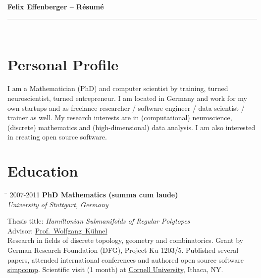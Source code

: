 \documentclass[10pt]{article} %
\newlength{\marginwidth}
\newlength{\smallertextwidth}
\renewcommand{\title}[1]{
{\huge{\color{headercolor}\textbf{#1}}}\\
\rule{\textwidth}{0.5mm}\\
}
\newcommand{\education}[4]{
\begin{tabbing}%
\hspace{\marginwidth}\=\kill%
{#1} \> \textbf{#2}\\
\>\+ \textit{#3}\\[5pt]
\begin{minipage}{\smallertextwidth}
\vspace{5pt}
#4
\end{minipage}
\end{tabbing}
}
\begin{document}

\title{Felix Effenberger -- Résumé}




\section{Personal Profile}
%
I am a Mathematician (PhD) and computer scientist by training, turned neuroscientist, turned entrepreneur. 
I am located in Germany and work for my own startups and as freelance researcher / software engineer / data scientist / trainer as well.
My research interests are in (computational) neuroscience, (discrete) mathematics and (high-dimensional) data analysis.
I am also interested in creating open source software.


\section{Education}
%
\education
{2007-2011}
{PhD Mathematics \textmd{(summa cum laude)}}
{\href{https://uni-stuttgart.de}{University of Stuttgart, Germany}}
{
Thesis title: \textit{Hamiltonian Submanifolds of Regular Polytopes}\\
Advisor: \href{http://www.igt.uni-stuttgart.de/LstDiffgeo/Kuehnel/}{Prof.~Wolfgang~Kühnel}\\[5pt]
%
Research in fields of discrete topology, geometry and combinatorics.
Grant by German Research Foundation (DFG), Project Ku 1203/5.
Published several papers, attended international conferences and authored open source software \href{https://github.com/simpcomp-team/simpcomp}{simpcomp}.
Scientific visit (1 month) at \href{https://www.cornell.edu}{Cornell University}, Ithaca, NY. 
}

\vspace{2mm}
\end{document}
